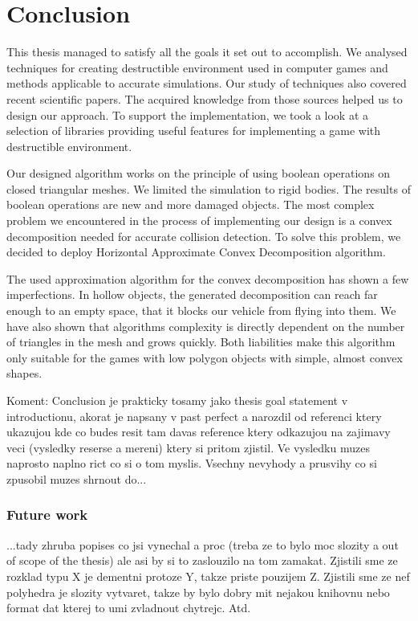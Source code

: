 \chapter*{Conclusion}

This thesis managed to satisfy all the goals it set out to accomplish. We analysed techniques for creating destructible environment used in computer games and methods applicable to accurate simulations. Our study of techniques also covered recent scientific papers. The acquired knowledge from those sources helped us to design our approach. To support the implementation, we took a look at a selection of libraries providing useful features for implementing a game with destructible environment.

Our designed algorithm works on the principle of using boolean operations on closed triangular meshes. We limited the simulation to rigid bodies. The results of boolean operations are new and more damaged objects. The most complex problem we encountered in the process of implementing our design is a convex decomposition needed for accurate collision detection. To solve this problem, we decided to deploy Horizontal Approximate Convex Decomposition algorithm.

The used approximation algorithm for the convex decomposition has shown a few imperfections. In hollow objects, the generated decomposition can reach far enough to an empty space, that it blocks our vehicle from flying into them. We have also shown that algorithms complexity is directly dependent on the number of triangles in the mesh and grows quickly. Both liabilities make this algorithm only suitable for the games with low polygon objects with simple, almost convex shapes.


Koment: Conclusion je prakticky tosamy jako thesis goal statement v introductionu, akorat je napsany v past perfect a narozdil od referenci ktery ukazujou kde co budes resit tam davas reference ktery odkazujou na zajimavy veci (vysledky reserse a mereni) ktery si pritom zjistil. Ve vysledku muzes naprosto naplno rict co si o tom myslis. Vsechny nevyhody a prusvihy co si zpusobil muzes shrnout do...

\subsection*{Future work}

...tady zhruba popises co jsi vynechal a proc (treba ze to bylo moc slozity a out of scope of the thesis) ale asi by si to zaslouzilo na tom zamakat. Zjistili sme ze rozklad typu X je dementni protoze Y, takze priste pouzijem Z. Zjistili sme ze nef polyhedra je slozity vytvaret, takze by bylo dobry mit nejakou knihovnu nebo format dat kterej to umi zvladnout chytrejc. Atd.
